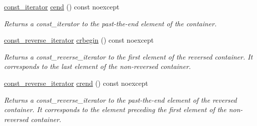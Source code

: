 \begin{DoxyCompactItemize}
\hyperlink{classcrsc_1_1priority__queue_a35736d93262db4fdd6d4a71bf785f9b9}{const\+\_\+iterator} \hyperlink{classcrsc_1_1priority__queue_a34e337055fa734f662ff5fae137cbefb}{cend} () const  noexcept
\begin{DoxyCompactList}\small\item\em Returns a const\+\_\+iterator to the past-\/the-\/end element of the container. \end{DoxyCompactList}\item 
\hyperlink{classcrsc_1_1priority__queue_a8f8f07cb4cbb172b421ff41867fbcfb9}{const\+\_\+reverse\+\_\+iterator} \hyperlink{classcrsc_1_1priority__queue_a0c0992bca6797f683543ba15cceeebad}{crbegin} () const  noexcept
\begin{DoxyCompactList}\small\item\em Returns a const\+\_\+reverse\+\_\+iterator to the first element of the reversed container. It corresponds to the last element of the non-\/reversed container. \end{DoxyCompactList}\item 
\hyperlink{classcrsc_1_1priority__queue_a8f8f07cb4cbb172b421ff41867fbcfb9}{const\+\_\+reverse\+\_\+iterator} \hyperlink{classcrsc_1_1priority__queue_a82953a7117eaabd34c66f62a4d664dfd}{crend} () const  noexcept
\begin{DoxyCompactList}\small\item\em Returns a const\+\_\+reverse\+\_\+iterator to the past-\/the-\/end element of the reversed container. It corresponds to the element preceding the first element of the non-\/reversed container. \end{DoxyCompactList}\end{DoxyCompactItemize}
